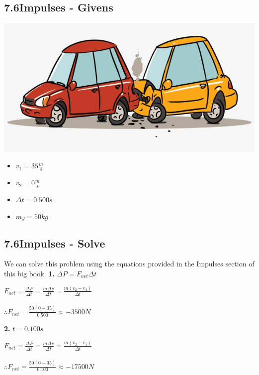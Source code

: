 \documentclass{article}
\begin{document}
\begin{adjustwidth}{1cm}{0pt}
    \subsection*{7.6\hspace*{0.5cm}Impulses - Givens}
    \begin{minipage}{0.5\textwidth}
        \includegraphics[scale=0.2]{./images/car_crash.png}
    \end{minipage}
    \begin{minipage}{0.5\textwidth}
        \begin{itemize}
            \item $v_{1} = 35\frac{m}{s}$
            \item $v_{2} = 0\frac{m}{s}$
            \item $\Delta t = 0.500s$
            \item $m_{J} = 50kg$
        \end{itemize}
    \end{minipage}
    \subsection*{7.6\hspace*{0.5cm}Impulses - Solve}
    We can solve this problem using the equations provided in the Impulses section of this big book.\newline\newline
    \textbf{1.} $\Delta P = F_{net}\Delta t$ \\
    \begin{adjustwidth}{0.6cm}{0pt}
        $F_{net} = \frac{\Delta P}{\Delta t} = \frac{m\Delta v}{\Delta t} = \frac{m(v_{2} - v_{1})}{\Delta t}$ \\\\
        $\therefore F_{net} = \frac{50(0 - 35)}{0.500} \approx -3500N$
    \end{adjustwidth}\vspace*{15pt}
    \textbf{2.} $t = 0.100s$ \\
    \begin{adjustwidth}{0.6cm}{0pt}
        $F_{net} = \frac{\Delta P}{\Delta t} = \frac{m\Delta v}{\Delta t} = \frac{m(v_{2} - v_{1})}{\Delta t}$ \\\\
        $\therefore F_{net} = \frac{50(0 - 35)}{0.100} \approx -17500N$
    \end{adjustwidth}\vspace*{15pt}

\end{adjustwidth}
\end{document}
